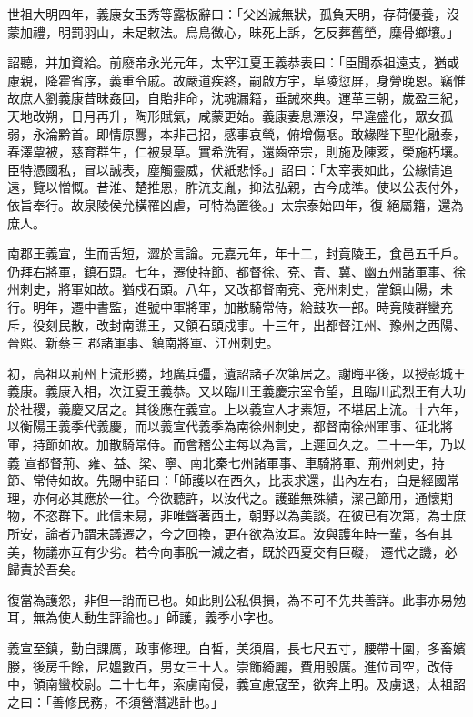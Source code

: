 \begin{pinyinscope}
 世祖大明四年，義康女玉秀等露板辭曰：「父凶滅無狀，孤負天明，存荷優養，沒蒙加禮，明罰羽山，未足敕法。烏鳥微心，昧死上訴，乞反葬舊塋，糜骨鄉壤。」



 詔聽，并加資給。前廢帝永光元年，太宰江夏王義恭表曰：「臣聞忝祖遠支，猶或慮親，降霍省序，義重令戚。故嚴道疾終，嗣啟方宇，阜陵愆屏，身膋晚恩。竊惟故庶人劉義康昔昧姦回，自貽非命，沈魂漏籍，垂誡來典。運革三朝，歲盈三紀，
 天地改朔，日月再升，陶形賦氣，咸蒙更始。義康妻息漂沒，早違盛化，眾女孤弱，永淪黔首。即情原釁，本非己招，感事哀煢，俯增傷咽。敢緣陛下聖化融泰，春澤覃被，慈育群生，仁被泉草。實希洗宥，還齒帝宗，則施及陳荄，榮施朽壤。臣特憑國私，冒以誠表，塵觸靈威，伏紙悲悸。」詔曰：「太宰表如此，公緣情追遠，覽以憎慨。昔淮、楚推恩，胙流支胤，抑法弘親，古今成準。使以公表付外，依旨奉行。故泉陵侯允橫罹凶虐，可特為置後。」太宗泰始四年，復
 絕屬籍，還為庶人。



 南郡王義宣，生而舌短，澀於言論。元嘉元年，年十二，封竟陵王，食邑五千戶。仍拜右將軍，鎮石頭。七年，遷使持節、都督徐、兗、青、冀、幽五州諸軍事、徐州刺史，將軍如故。猶戍石頭。八年，又改都督南兗、兗州刺史，當鎮山陽，未行。明年，遷中書監，進號中軍將軍，加散騎常侍，給鼓吹一部。時竟陵群蠻充斥，役刻民散，改封南譙王，又領石頭戍事。十三年，出都督江州、豫州之西陽、晉熙、新蔡三
 郡諸軍事、鎮南將軍、江州刺史。



 初，高祖以荊州上流形勝，地廣兵彊，遺詔諸子次第居之。謝晦平後，以授彭城王義康。義康入相，次江夏王義恭。又以臨川王義慶宗室令望，且臨川武烈王有大功於社稷，義慶又居之。其後應在義宣。上以義宣人才素短，不堪居上流。十六年，以衡陽王義季代義慶，而以義宣代義季為南徐州刺史，都督南徐州軍事、征北將軍，持節如故。加散騎常侍。而會稽公主每以為言，上遲回久之。二十一年，乃以義
 宣都督荊、雍、益、梁、寧、南北秦七州諸軍事、車騎將軍、荊州刺史，持節、常侍如故。先賜中詔曰：「師護以在西久，比表求還，出內左右，自是經國常理，亦何必其應於一往。今欲聽許，以汝代之。護雖無殊績，潔己節用，通懷期物，不恣群下。此信未易，非唯聲著西土，朝野以為美談。在彼已有次第，為士庶所安，論者乃謂未議遷之，今之回換，更在欲為汝耳。汝與護年時一輩，各有其美，物議亦互有少劣。若今向事脫一減之者，既於西夏交有巨礙，
 遷代之譏，必歸責於吾矣。



 復當為護怨，非但一誚而已也。如此則公私俱損，為不可不先共善詳。此事亦易勉耳，無為使人動生評論也。」師護，義季小字也。



 義宣至鎮，勤自課厲，政事修理。白皙，美須眉，長七尺五寸，腰帶十圍，多畜嬪媵，後房千餘，尼媼數百，男女三十人。崇飾綺麗，費用殷廣。進位司空，改侍中，領南蠻校尉。二十七年，索虜南侵，義宣慮寇至，欲奔上明。及虜退，太祖詔之曰：「善修民務，不須營潛逃計也。」




\end{pinyinscope}
